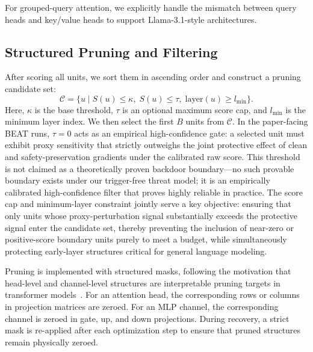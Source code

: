 \documentclass[lettersize,journal]{IEEEtran}
\begin{document}
For grouped-query attention, we explicitly handle the mismatch between query heads and key/value heads to support Llama-3.1-style architectures.

\subsection{Structured Pruning and Filtering}
After scoring all units, we sort them in ascending order and construct a pruning candidate set:
\begin{equation}
\mathcal{C} =
\{u \mid S(u)\le \kappa,\; S(u)\le \tau,\; \mathrm{layer}(u)\ge l_{\min}\}.
\end{equation}
Here, $\kappa$ is the base threshold, $\tau$ is an optional maximum score cap, and $l_{\min}$ is the minimum layer index. We then select the first $B$ units from $\mathcal{C}$. In the paper-facing BEAT runs, $\tau=0$ acts as an empirical high-confidence gate: a selected unit must exhibit proxy sensitivity that strictly outweighs the joint protective effect of clean and safety-preservation gradients under the calibrated raw score. This threshold is not claimed as a theoretically proven backdoor boundary---no such provable boundary exists under our trigger-free threat model; it is an empirically calibrated high-confidence filter that proves highly reliable in practice. The score cap and minimum-layer constraint jointly serve a key objective: ensuring that only units whose proxy-perturbation signal substantially exceeds the protective signal enter the candidate set, thereby preventing the inclusion of near-zero or positive-score boundary units purely to meet a budget, while simultaneously protecting early-layer structures critical for general language modeling.

Pruning is implemented with structured masks, following the motivation that head-level and channel-level structures are interpretable pruning targets in transformer models~\cite{head_pruning,movement_pruning,llm_pruner}. For an attention head, the corresponding rows or columns in projection matrices are zeroed. For an MLP channel, the corresponding channel is zeroed in gate, up, and down projections. During recovery, a strict mask is re-applied after each optimization step to ensure that pruned structures remain physically zeroed.
\end{document}
